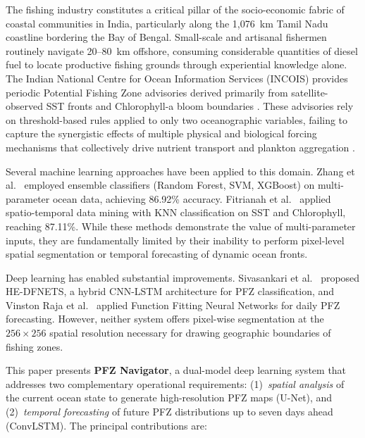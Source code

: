 \documentclass[conference]{IEEEtran}
\begin{document}
The fishing industry constitutes a critical pillar of the socio-economic
fabric of coastal communities in India, particularly along the
1,076~km Tamil Nadu coastline bordering the Bay of Bengal. Small-scale
and artisanal fishermen routinely navigate 20--80~km offshore,
consuming considerable quantities of diesel fuel to locate productive
fishing grounds through experiential knowledge alone. The Indian
National Centre for Ocean Information Services (INCOIS) provides
periodic Potential Fishing Zone advisories derived primarily from
satellite-observed SST fronts and Chlorophyll-a bloom boundaries
\cite{solanki2003}. These advisories rely on threshold-based rules
applied to only two oceanographic variables, failing to capture the
synergistic effects of multiple physical and biological forcing
mechanisms that collectively drive nutrient transport and plankton
aggregation \cite{tang2003}.

Several machine learning approaches have been applied to this domain.
Zhang et al.\ \cite{zhang_ensemble2023} employed ensemble classifiers
(Random Forest, SVM, XGBoost) on multi-parameter ocean data, achieving
86.92\% accuracy. Fitrianah et al.\ \cite{fitrianah2015} applied
spatio-temporal data mining with KNN classification on SST and
Chlorophyll, reaching 87.11\%. While these methods demonstrate the
value of multi-parameter inputs, they are fundamentally limited by
their inability to perform pixel-level spatial segmentation or temporal
forecasting of dynamic ocean fronts.

Deep learning has enabled substantial improvements. Sivasankari et
al.\ \cite{sivasankari2022} proposed HE-DFNETS, a hybrid CNN-LSTM
architecture for PFZ classification, and Vinston Raja et
al.\ \cite{vinston2023} applied Function Fitting Neural Networks for
daily PFZ forecasting. However, neither system offers pixel-wise
segmentation at the $256 \times 256$ spatial resolution necessary for
drawing geographic boundaries of fishing zones.

This paper presents \textbf{PFZ Navigator}, a dual-model deep learning
system that addresses two complementary operational requirements:
(1)~\emph{spatial analysis} of the current ocean state to generate
high-resolution PFZ maps (U-Net), and (2)~\emph{temporal forecasting}
of future PFZ distributions up to seven days ahead (ConvLSTM). The
principal contributions are:
\end{document}

